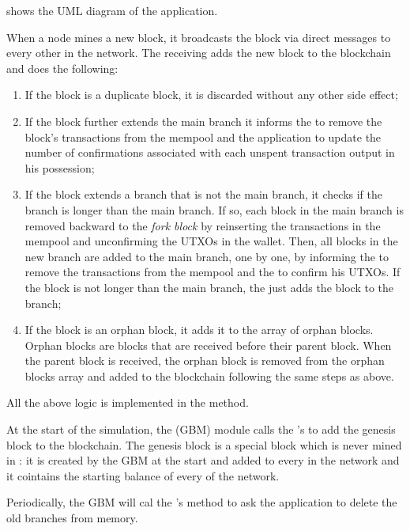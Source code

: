  shows the UML diagram of the application.

When a node mines a new block, it broadcasts the block via direct messages to
every other  in the network. The receiving
 adds the new block to the blockchain and does the
following:
\begin{enumerate}
	\item If the block is a duplicate block, it is discarded without any
		other side effect;
	\item If the block further extends the main branch it informs the
		 to remove the block's transactions from
		the mempool and the  application to update the
		number of confirmations associated with each unspent
		transaction output in his possession;
	\item If the block extends a branch that is not the main branch, it
		checks if the branch is longer than the main branch. If so,
		each block in the main branch is removed backward to the
		\emph{fork block} by reinserting the transactions in the
		mempool and unconfirming the UTXOs in the wallet. Then, all
		blocks in the new branch are added to the main branch, one by
		one, by informing the  to remove the
		transactions from the mempool and the  to confirm
		his UTXOs. If the block is not longer than the main branch, the
		 just adds the block to the branch;
	\item If the block is an orphan block, it adds it to the array of orphan
		blocks. Orphan blocks are blocks that are received before their
		parent block. When the parent block is received, the orphan
		block is removed from the orphan blocks array and added to the
		blockchain following the same steps as above.
\end{enumerate}

All the above logic is implemented in the  method.

At the start of the simulation, the  (GBM) module
calls the 's  to add the genesis
block to the blockchain. The genesis block is a special block which is never
mined in \iblock{}: it is created by the GBM at the start and added to every
 in the network and it cointains the starting balance
of every  of the network.

Periodically, the GBM will cal the 's 
method to ask the application to delete the old branches from memory.

